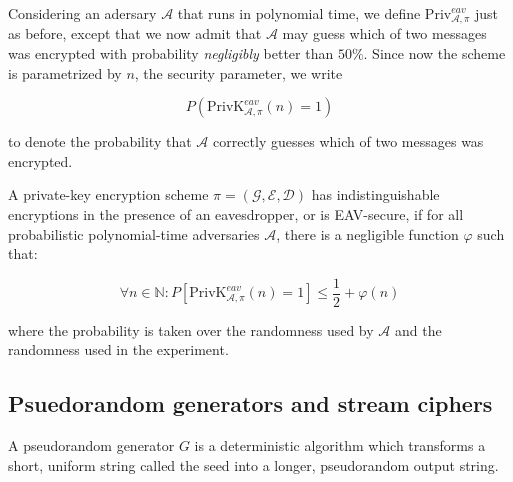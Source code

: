 \documentclass[a4paper, 12pt]{article}
\begin{document}
Considering an adersary $\mathcal{A}$  that runs in polynomial time,
we define $\text{Priv}_{\mathcal{A}, \pi}^{eav}$ just as before,
except that we now admit that $\mathcal{A}$ may guess which of 
two messages was encrypted with probability \textit{negligibly}
better than $50\%$. Since now the scheme is parametrized by 
$n$, the security parameter, we write 

\begin{equation*}
    P(\text{PrivK}^{eav}_{\mathcal{A}, \pi}(n) = 1)
\end{equation*}

to denote the probability that $\mathcal{A}$ correctly guesses 
which of two messages was encrypted.

\begin{definition}
    A private-key encryption scheme $\pi = (\mathcal{G}, \mathcal{E}, \mathcal{D})$ has indistinguishable encryptions in the presence of an 
    eavesdropper, or is EAV-secure, if for all probabilistic 
    polynomial-time adversaries $\mathcal{A}$, there is a 
    negligible function $\varphi$ such that:

    \begin{equation*}
        \forall n \in \mathbb{N} : P\left[ \text{PrivK}_{\mathcal{A}, \pi}^{eav}(n) = 1 \right] \leq \frac{1}{2} + \varphi(n)
    \end{equation*}

    where the probability is taken over the randomness used by 
    $\mathcal{A}$ and the randomness used in the experiment.
\end{definition}

\subsection{Psuedorandom generators and stream ciphers}

A pseudorandom generator $G$ is a deterministic algorithm which 
transforms a short, uniform string called the seed into a longer,
pseudorandom output string. 
\end{document}
